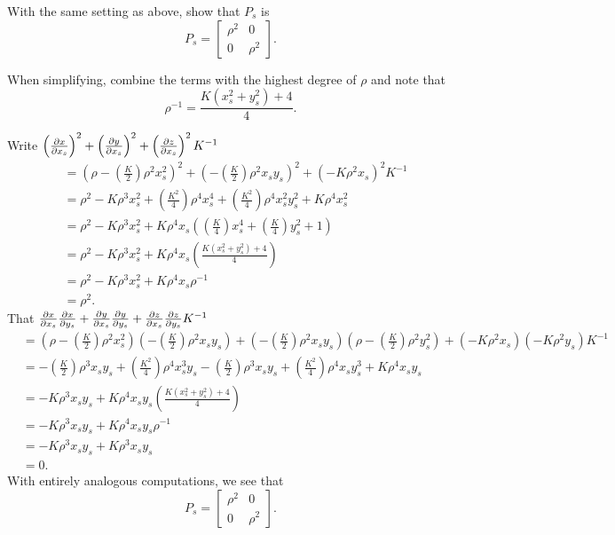 \documentclass{ximera}
\begin{document}
\begin{problem}
With the same setting as above, show that $P_s$ is
  \[
  P_s =
  \begin{bmatrix}
    \rho^2 & 0\\
    0 & \rho^2
  \end{bmatrix}.
  \]
  \begin{hint}
  When simplifying, combine the terms with the highest degree of $\rho$
  and note that
  \[
  \rho^{-1} = \frac{K\left(x_s^2 + y_s^2\right)+4}{4}.
  \]
\end{hint}
\begin{freeResponse}
  Write $\left(\pp[x]{x_s}\right)^2 + \left(\pp[y]{x_s}\right)^2 +\left(\pp[z]{x_s}\right)^2K^{-1}$
  \begin{align*}
    &=\left(\rho-\left(\frac{K}{2}\right)\rho^2x_s^2\right)^2 + \left(-\left(\frac{K}{2}\right)\rho^2x_sy_s\right)^2 +\left(-K\rho^2x_s\right)^2K^{-1}\\
    &=\rho^2 -K\rho^3x_s^2 + \left(\frac{K^2}{4}\right)\rho^4x_s^4 + \left(\frac{K^2}{4}\right)\rho^4x_s^2y_s^2 + K\rho^4x_s^2\\
    &=\rho^2 -K\rho^3x_s^2 + K\rho^4x_s\left(\left(\frac{K}{4}\right)x_s^4 + \left(\frac{K}{4}\right)y_s^2 + 1\right)\\
    &=\rho^2 -K\rho^3x_s^2 + K\rho^4x_s\left(\frac{K\left(x_s^2+y_s^2\right)+4}{4}\right)\\
    &=\rho^2 -K\rho^3x_s^2 + K\rho^4x_s\rho^{-1}\\
    &=\rho^2.
  \end{align*}
  That $\pp[x]{x_s}\pp[x]{y_s} + \pp[y]{x_s}\pp[y]{y_s} + \pp[z]{x_s}\pp[z]{y_s} K^{-1}$
  \begin{align*}
    &=\left(\rho-\left(\frac{K}{2}\right)\rho^2x_s^2\right)\left(-\left(\frac{K}{2}\right)\rho^2x_sy_s\right)
    + \left(-\left(\frac{K}{2}\right)\rho^2x_sy_s\right)\left(\rho-\left(\frac{K}{2}\right)\rho^2y_s^2\right)
    + \left(-K\rho^2x_s\right)\left(-K\rho^2y_s\right) K^{-1}\\
    &=
    -\left(\frac{K}{2}\right)\rho^3x_sy_s+\left(\frac{K^2}{4}\right)\rho^4x_s^3y_s
    -\left(\frac{K}{2}\right)\rho^3x_sy_s+\left(\frac{K^2}{4}\right)\rho^4x_sy_s^3
    + K\rho^4 x_sy_s\\
    &= -K\rho^3x_sy_s + K\rho^4x_sy_s\left(\frac{K\left(x_s^2+y_s^2\right)+4}{4}\right)\\
    &= -K\rho^3x_sy_s + K\rho^4x_sy_s\rho^{-1}\\
    &= -K\rho^3x_sy_s + K\rho^3x_sy_s\\
    &=0.
  \end{align*}
  With entirely analogous computations, we see that 
    \[
    P_s =
    \begin{bmatrix}
      \rho^2 & 0\\
      0 & \rho^2
    \end{bmatrix}.
    \]
\end{freeResponse}
\end{problem}
\end{document}
